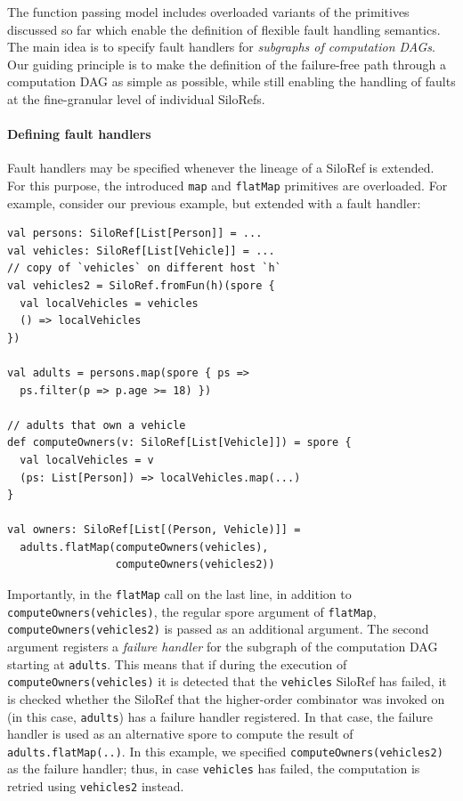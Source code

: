 \documentclass{jfp1}
\begin{document}
The function passing model includes overloaded variants of the primitives
discussed so far which enable the definition of flexible fault handling
semantics. The main idea is to specify fault handlers for \emph{subgraphs of
computation DAGs}. Our guiding principle is to make the definition of the
failure-free path through a computation DAG as simple as possible, while still
enabling the handling of faults at the fine-granular level of individual
SiloRefs.

\paragraph{Defining fault handlers}

Fault handlers may be specified whenever the lineage of a SiloRef is extended.
For this purpose, the introduced \verb|map| and \verb|flatMap| primitives are
overloaded. For example, consider our previous example, but extended with a
fault handler:

\begin{lstlisting}
val persons: SiloRef[List[Person]] = ...
val vehicles: SiloRef[List[Vehicle]] = ...
// copy of `vehicles` on different host `h`
val vehicles2 = SiloRef.fromFun(h)(spore {
  val localVehicles = vehicles
  () => localVehicles
})

val adults = persons.map(spore { ps =>
  ps.filter(p => p.age >= 18) })

// adults that own a vehicle
def computeOwners(v: SiloRef[List[Vehicle]]) = spore {
  val localVehicles = v
  (ps: List[Person]) => localVehicles.map(...)
}

val owners: SiloRef[List[(Person, Vehicle)]] =
  adults.flatMap(computeOwners(vehicles),
                 computeOwners(vehicles2))
\end{lstlisting}

Importantly, in the \verb|flatMap| call on the last line, in addition to
\verb|computeOwners(vehicles)|, the regular spore argument of \verb|flatMap|,
\verb|computeOwners(vehicles2)| is passed as an additional argument. The second
argument registers a \emph{failure handler} for the subgraph of the computation
DAG starting at \verb|adults|. This means that if during the execution of
\verb|computeOwners(vehicles)| it is detected that the \verb|vehicles| SiloRef
has failed, it is checked whether the SiloRef that the higher-order combinator
was invoked on (in this case, \verb|adults|) has a failure handler registered.
In that case, the failure handler is used as an alternative spore to compute the
result of \verb|adults.flatMap(..)|. In this example, we specified
\verb|computeOwners(vehicles2)| as the failure handler; thus, in case
\verb|vehicles| has failed, the computation is retried using \verb|vehicles2|
instead.
\end{document}
